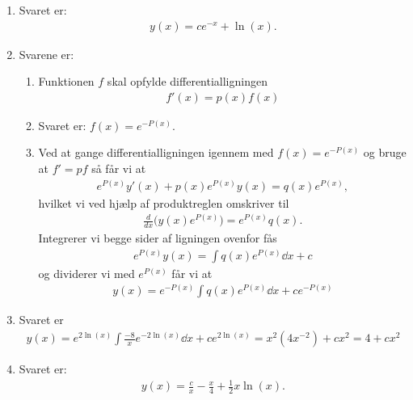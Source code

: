 \begin{enumerate}
	\item Svaret er:
	\begin{align*}
	y(x)=ce^{-x}+ \ln(x).
	\end{align*}
		
	
	\item Svarene er:
	\begin{enumerate}
		\item Funktionen $f$ skal opfylde differentialligningen
		\begin{align*}
		f'(x)=p(x)f(x)
		\end{align*}
		
		\item Svaret er: $f(x)=e^{-P(x)}$.
		
		\item Ved at gange differentialligningen igennem med $f(x)=e^{-P(x)}$ og bruge at $f'=pf$ så får vi at
		\begin{align*}
		e^{P(x)}y'(x)+p(x)e^{P(x)}y(x)=q(x)e^{P(x)},
		\end{align*}
		hvilket vi ved hjælp af produktreglen omskriver til
		\begin{align*}
		\frac{d}{dx} \Big(y(x) e^{P(x)} \Big)=e^{P(x)}q(x).
		\end{align*}
		Integrerer vi begge sider af ligningen ovenfor fås
		\begin{align*}
		e^{P(x)}y(x)=\int q(x)e^{P(x)}\dd x+c
		\end{align*}
		og dividerer vi med $e^{P(x)}$ får vi at
		\begin{align*}
		y(x)=e^{-P(x)}\int q(x)e^{P(x)}\dd x+ce^{-P(x)}
		\end{align*}

	\end{enumerate}
	
	\item Svaret er
	\begin{align*}
	y(x)=e^{2\ln(x)}\int\frac{-8}{x}e^{-2\ln(x)}\dd x+ce^{2\ln(x)}=x^2(4x^{-2})+cx^2=4+cx^2
	\end{align*}
	
	\item Svaret er:
	\begin{align*}
	y(x)=\frac{c}{x}-\frac{x}{4}+\frac{1}{2}x\ln(x).
	\end{align*}
	
	
	
\end{enumerate}